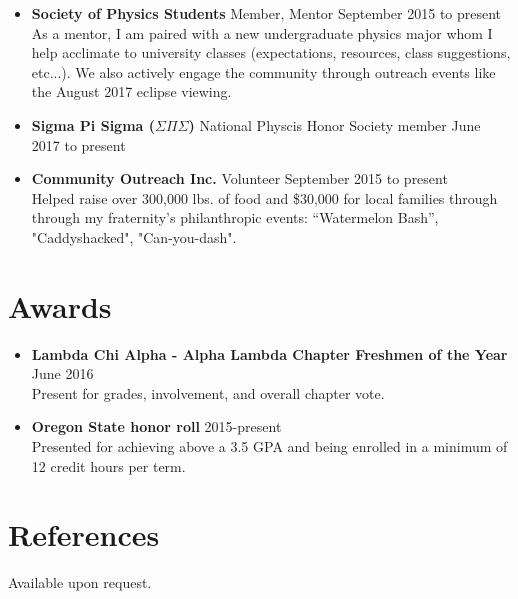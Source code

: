 \documentclass[margin,line]{res}
\begin{document}
\begin{resume}
\begin{itemize}
	\item {\bf Society of Physics Students} Member, Mentor \hfill September 2015 to present\\ 
	As a mentor, I am paired with a new undergraduate physics major whom I help acclimate to university classes (expectations, resources, class suggestions, etc...). We also actively engage the community through outreach events like the August 2017 eclipse viewing.
	
	\item {\bf Sigma Pi Sigma ($\Sigma \Pi \Sigma$)} National Physcis Honor Society member \hfill June 2017 to present
	
	\item {\bf Community Outreach Inc.} Volunteer \hfill September 2015 to present\\
	Helped raise over 300,000 lbs. of food and \$30,000 for local families through through my fraternity's philanthropic events: “Watermelon Bash”, "Caddyshacked", "Can-you-dash".
	
\end{itemize} 

\section{\sc Awards}
\begin{itemize}
	\item {\bf Lambda Chi Alpha - Alpha Lambda Chapter Freshmen of the Year} \hfill June 2016\\
	Present for grades, involvement, and overall chapter vote.
	
	\item {\bf Oregon State honor roll} \hfill 2015-present\\
	Presented for achieving above a 3.5 GPA and being enrolled in a minimum of 12 credit hours per term. 
\end{itemize}
\section{\sc References }
Available upon request.

\end{resume}
\end{document}
